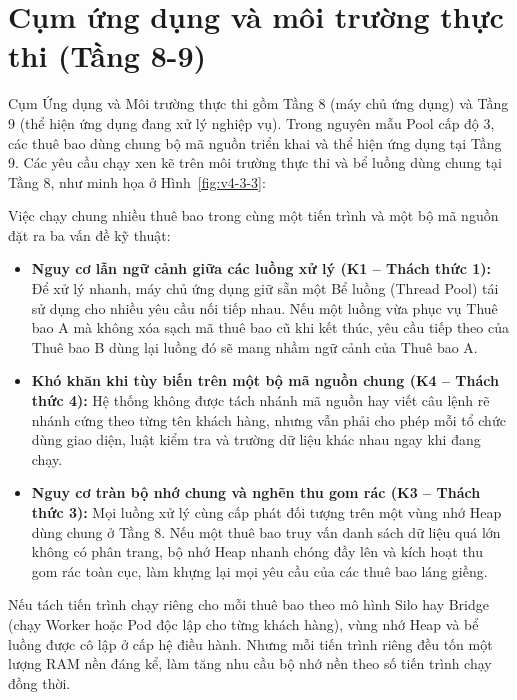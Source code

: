 \section{Cụm ứng dụng và môi trường thực thi (Tầng 8-9)}\label{v4-sec-3-3}

Cụm Ứng dụng và Môi trường thực thi gồm Tầng 8 (máy chủ ứng dụng) và Tầng 9 (thể hiện ứng dụng đang xử lý nghiệp vụ). Trong nguyên mẫu Pool cấp độ 3, các thuê bao dùng chung bộ mã nguồn triển khai và thể hiện ứng dụng tại Tầng 9. Các yêu cầu chạy xen kẽ trên môi trường thực thi và bể luồng dùng chung tại Tầng 8, như minh họa ở Hình~\ref{fig:v4-3-3}:


Việc chạy chung nhiều thuê bao trong cùng một tiến trình và một bộ mã nguồn đặt ra ba vấn đề kỹ thuật:

\begin{itemize}
\item
  \textbf{Nguy cơ lẫn ngữ cảnh giữa các luồng xử lý (K1 -- Thách thức 1):} Để xử lý nhanh, máy chủ ứng dụng giữ sẵn một Bể luồng (Thread Pool) tái sử dụng cho nhiều yêu cầu nối tiếp nhau. Nếu một luồng vừa phục vụ Thuê bao A mà không xóa sạch mã thuê bao cũ khi kết thúc, yêu cầu tiếp theo của Thuê bao B dùng lại luồng đó sẽ mang nhầm ngữ cảnh của Thuê bao A.
\item
  \textbf{Khó khăn khi tùy biến trên một bộ mã nguồn chung (K4 -- Thách thức 4):} Hệ thống không được tách nhánh mã nguồn hay viết câu lệnh rẽ nhánh cứng theo từng tên khách hàng, nhưng vẫn phải cho phép mỗi tổ chức dùng giao diện, luật kiểm tra và trường dữ liệu khác nhau ngay khi đang chạy.
\item
  \textbf{Nguy cơ tràn bộ nhớ chung và nghẽn thu gom rác (K3 -- Thách thức 3):} Mọi luồng xử lý cùng cấp phát đối tượng trên một vùng nhớ Heap dùng chung ở Tầng 8. Nếu một thuê bao truy vấn danh sách dữ liệu quá lớn không có phân trang, bộ nhớ Heap nhanh chóng đầy lên và kích hoạt thu gom rác toàn cục, làm khựng lại mọi yêu cầu của các thuê bao láng giềng.
\end{itemize}

Nếu tách tiến trình chạy riêng cho mỗi thuê bao theo mô hình Silo hay Bridge (chạy Worker hoặc Pod độc lập cho từng khách hàng), vùng nhớ Heap và bể luồng được cô lập ở cấp hệ điều hành. Nhưng mỗi tiến trình riêng đều tốn một lượng RAM nền đáng kể, làm tăng nhu cầu bộ nhớ nền theo số tiến trình chạy đồng thời.

